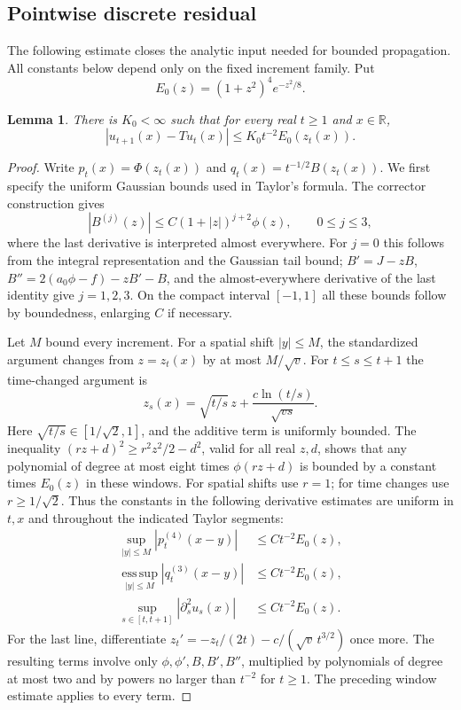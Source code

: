 \documentclass[11pt,a4paper]{article}
\newtheorem{lemma}[theorem]{Lemma}
\theoremstyle{definition}\newtheorem{definition}[theorem]{Definition}
\theoremstyle{remark}\newtheorem{remark}[theorem]{Remark}
\newcommand{\R}{\mathbb R}
\numberwithin{equation}{section}
\begin{document}
\subsection{Pointwise discrete residual}\label{sec:residual}
The following estimate closes the analytic input needed for bounded
propagation. All constants below depend only on the fixed increment family.
Put
\[
 E_0(z)=(1+z^2)^4e^{-z^2/8}.
\]
\begin{lemma}\label{log:lem:residual}
There is $K_0<\infty$ such that for every real $t\ge1$ and $x\in\R$,
\begin{equation}\label{log:eq:input}
 |u_{t+1}(x)-Tu_t(x)|\le K_0t^{-2}E_0(z_t(x)).
\end{equation}
\end{lemma}
\begin{proof}
Write $p_t(x)=\Phi(z_t(x))$ and $q_t(x)=t^{-1/2}B(z_t(x))$.
We first specify the uniform Gaussian bounds used in Taylor's formula.
The corrector construction gives
\[
 |B^{(j)}(z)|\le C(1+|z|)^{j+2}\phi(z),\qquad 0\le j\le3,
\]
where the last derivative is interpreted almost everywhere. For $j=0$
this follows from the integral representation and the Gaussian tail bound;
$B'=J-zB$, $B''=2(a_0\phi-f)-zB'-B$, and the almost-everywhere derivative
of the last identity give $j=1,2,3$. On the compact interval $[-1,1]$
all these bounds follow by boundedness, enlarging $C$ if necessary.

Let $M$ bound every increment. For a spatial shift $|y|\le M$, the
standardized argument changes from $z=z_t(x)$ by at most $M/\sqrt v$.
For $t\le s\le t+1$ the time-changed argument is
\[
 z_s(x)=\sqrt{t/s}\,z+
       \frac{c\ln(t/s)}{\sqrt{vs}}.
\]
Here $\sqrt{t/s}\in[1/\sqrt2,1]$, and the additive term is uniformly
bounded. The inequality $(r z+d)^2\ge r^2z^2/2-d^2$, valid for all real
$z,d$, shows that any polynomial of degree at most eight times
$\phi(rz+d)$ is bounded by a constant times $E_0(z)$ in these windows.
For spatial shifts use $r=1$; for time changes use $r\ge1/\sqrt2$.
Thus the constants in the following derivative estimates are uniform
in $t,x$ and throughout the indicated Taylor segments:
\begin{align*}
 \sup_{|y|\le M}|p_t^{(4)}(x-y)|&\le Ct^{-2}E_0(z),\\
 \operatorname*{ess\,sup}_{|y|\le M}|q_t^{(3)}(x-y)|
      &\le Ct^{-2}E_0(z),\\
 \sup_{s\in[t,t+1]}|\partial_s^2u_s(x)|&\le Ct^{-2}E_0(z).
\end{align*}
For the last line, differentiate
$z_t'=-z_t/(2t)-c/(\sqrt v\,t^{3/2})$ once more. The resulting terms
involve only $\phi,\phi',B,B',B''$, multiplied by polynomials of degree
at most two and by powers no larger than $t^{-2}$ for $t\ge1$.
The preceding window estimate applies to every term.


\end{proof}
\end{document}

